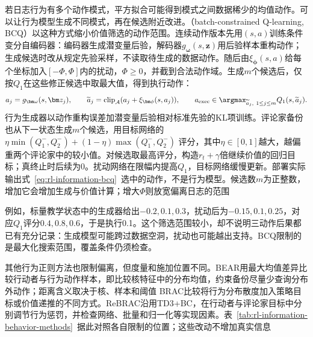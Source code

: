 若日志行为有多个动作模式，平方拟合可能得到模式之间数据稀少的均值动作。可以让行为模型生成不同模式，再在候选附近改进。（batch-constrained Q-learning, BCQ）以这种方式缩小价值筛选的动作范围。连续动作版本先用$(s,a)$训练条件变分自编码器：编码器生成潜变量后验，解码器$g_{\bm\omega}(s,\bm z)$用后验样本重构动作；生成候选时改从规定先验采样，不读取待生成的数据动作。随后由$\xi_{\bm\phi}(s,a)$给每个坐标加入$[-\Phi,\Phi]$内的扰动，$\Phi\geq0$，并截到合法动作域。生成$m$个候选后，仅按$Q_1$在这些修正候选中取最大值，得到执行动作：
\begin{equation}
  \label{eq:rl-information-bcq}
  a_j=g_{\bm\omega}(s,\bm z_j),\qquad
  \widetilde a_j=\operatorname{clip}_{\mathcal A}
                  (a_j+\xi_{\bm\phi}(s,a_j)),\qquad
  a_{\mathrm{exec}}\in\argmax_{\widetilde a_j,\ 1\leq j\leq m}
                  Q_1(s,\widetilde a_j).
\end{equation}
行为生成器以动作重构误差加潜变量后验相对标准先验的KL项训练。评论家备份也从下一状态生成$m$个候选，用目标网络的
$\eta\min(Q_1^-,Q_2^-)+(1-\eta)\max(Q_1^-,Q_2^-)$
评分，其中$\eta\in[0,1]$越大，越偏重两个评论家中的较小值。对候选取最高评分，构造$r_t+\gamma$倍继续价值的回归目标；真终止时后续为0。扰动网络在限幅内提高$Q_1$，目标网络缓慢更新。部署实际输出式~\eqref{eq:rl-information-bcq}~选中的动作，不是行为模型。候选数$m$为正整数，增加它会增加生成与价值计算；增大$\Phi$则放宽偏离日志的范围

例如，标量教学状态中的生成器给出$-0.2,0.1,0.3$，扰动后为$-0.15,0.1,0.25$，对应$Q_1$评分$0.4,0.8,0.6$，于是执行0.1。这个筛选范围较小，却不说明三动作后果都已有充分记录：生成模型可能跨过数据空洞，扰动也可能越出支持。BCQ限制的是最大化搜索范围，覆盖条件仍须检查。

其他行为正则方法也限制偏离，但度量和施加位置不同。BEAR用最大均值差异比较行动者与行为动作样本，即比较核特征中的分布均值，约束备份尽量少查询分布外动作；距离含义取决于核、样本和阈值
BRAC比较将行为分布散度加入策略目标或价值递推的不同方式。ReBRAC沿用TD3+BC，在行动者与评论家目标中分别调节行为惩罚，并检查网络、批量和归一化等实现因素。表~\ref{tab:rl-information-behavior-methods}~据此对照各自限制的位置；这些改动不增加真实信息


